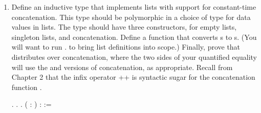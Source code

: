 \documentclass[12pt]{report}
\begin{document}
\begin{enumerate}
\begin{coqdoccode}
\coqdocindent{1.00em}
;  , ; . .\coqdoceol
\coqdocnoindent
{}  : \coqdockw{\ensuremath{\forall}} (   : ),  (  )    (  ) (  ).\coqdoceol
\coqdocindent{1.00em}
;  , , ; . .\coqdoceol
\coqdocemptyline
\coqdocnoindent
{} .\coqdoceol
\end{coqdoccode}
\item Define an inductive type  that implements lists with support for constant-time concatenation.  This type should be polymorphic in a choice of type for data values in lists.  The type  should have three constructors, for empty lists, singleton lists, and concatenation.  Define a function  that converts s to s.  (You will want to run   . to bring list definitions into scope.)  Finally, prove that  distributes over concatenation, where the two sides of your quantified equality will use the  and  versions of concatenation, as appropriate.  Recall from Chapter 2 that the infix operator ++ is syntactic sugar for the  concatenation function .
 \begin{coqdoccode}
\coqdocemptyline
\coqdocnoindent
{} .\coqdoceol
\coqdocnoindent
{}  .\coqdoceol
\coqdocnoindent
{}.\coqdoceol
\coqdocnoindent
{}  ( : ) : :=\coqdoceol

\end{coqdoccode}
\end{enumerate}
\end{document}
